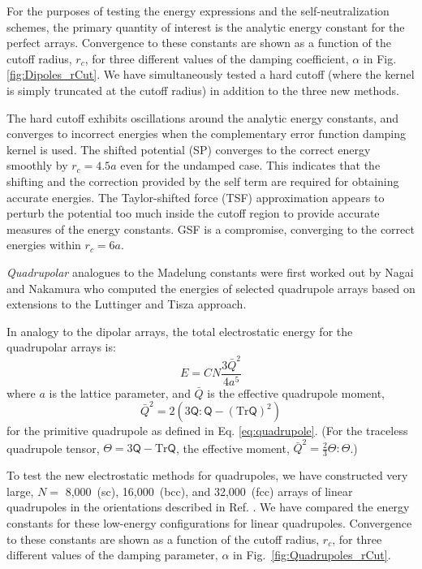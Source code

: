 For the purposes of testing the energy expressions and the
self-neutralization schemes, the primary quantity of interest is the
analytic energy constant for the perfect arrays.  Convergence to these
constants are shown as a function of the cutoff radius, $r_c$, for
three different values of the damping coefficient, $\alpha$ in
Fig.\ref{fig:Dipoles_rCut}.  We have simultaneously tested a hard
cutoff (where the kernel is simply truncated at the cutoff radius) in
addition to the three new methods.

The hard cutoff exhibits oscillations around the analytic energy
constants, and converges to incorrect energies when the complementary
error function damping kernel is used.  The shifted potential (SP)
converges to the correct energy smoothly by $r_c = 4.5 a$ even for the
undamped case. This indicates that the shifting and the correction
provided by the self term are required for obtaining accurate
energies. The Taylor-shifted force (TSF) approximation appears to
perturb the potential too much inside the cutoff region to provide
accurate measures of the energy constants.  GSF is a compromise,
converging to the correct energies within $r_c = 6 a$.

{\it Quadrupolar} analogues to the Madelung constants were first
worked out by Nagai and Nakamura who computed the energies of selected
quadrupole arrays based on extensions to the Luttinger and Tisza
approach.\cite{Nagai60,Nagai63} 

In analogy to the dipolar arrays, the total electrostatic energy for
the quadrupolar arrays is:
\begin{equation}
 E = C N \frac{3\bar{Q}^2}{4a^5} 
\end{equation} 
where $a$ is the lattice parameter, and $\bar{Q}$ is the effective
quadrupole moment,
\begin{equation}
\bar{Q}^2 = 2 \left(3 \mathsf{Q} : \mathsf{Q} - (\text{Tr} \mathsf{Q})^2 \right)
\end{equation}
for the primitive quadrupole as defined in Eq. \ref{eq:quadrupole}.
(For the traceless quadrupole tensor, $\mathsf{\Theta} = 3 \mathsf{Q} - \text{Tr} \mathsf{Q}$,
the effective moment, $\bar{Q}^2 = \frac{2}{3} \mathsf{\Theta} : \mathsf{\Theta}$.)

To test the new electrostatic methods for quadrupoles, we have
constructed very large, $N=$ 8,000~(sc), 16,000~(bcc), and
32,000~(fcc) arrays of linear quadrupoles in the orientations
described in Ref. \cite{Nagai60}.  We have compared the
energy constants for these low-energy configurations for linear
quadrupoles. Convergence to these constants are shown as a function of
the cutoff radius, $r_c$, for three different values of the damping
parameter, $\alpha$ in Fig.~\ref{fig:Quadrupoles_rCut}.

